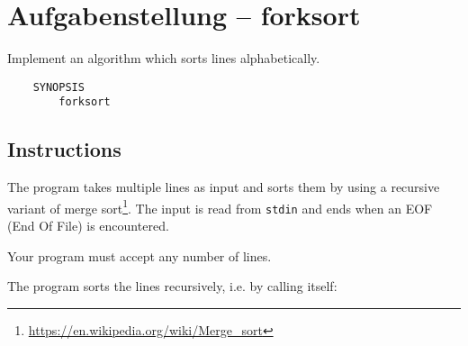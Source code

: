 




\section*{Aufgabenstellung -- forksort}
Implement an algorithm which sorts lines alphabetically.
\begin{verbatim}
    SYNOPSIS
        forksort
\end{verbatim}

\subsection*{Instructions}
The program takes multiple lines as input
and sorts them by using a recursive variant of merge sort\footnote{\url{https://en.wikipedia.org/wiki/Merge_sort}}.
The input is read from \texttt{stdin}
and ends when an EOF (End Of File) is encountered.

Your program must accept any number of lines.

The program sorts the lines recursively,
i.e. by calling itself:

